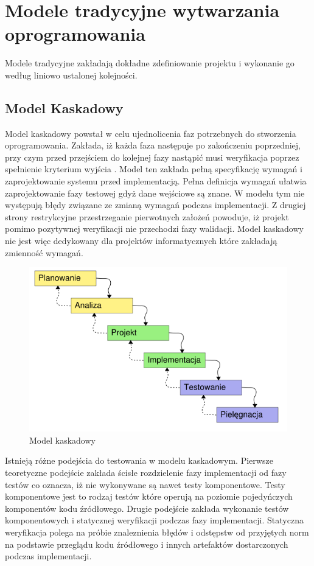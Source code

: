 \section{Modele tradycyjne wytwarzania oprogramowania}
Modele tradycyjne zakładają dokładne zdefiniowanie projektu i wykonanie go według liniowo ustalonej kolejności.
\subsection{Model Kaskadowy}
Model kaskadowy powstał w celu ujednolicenia faz potrzebnych do stworzenia oprogramowania. Zakłada, iż każda faza następuje po zakończeniu poprzedniej, przy czym przed przejściem do kolejnej fazy nastąpić musi weryfikacja poprzez spełnienie kryterium wyjścia \cite{SEaT}. Model ten zakłada pełną specyfikację wymagań i zaprojektowanie systemu przed implementacją. Pełna definicja wymagań ułatwia zaprojektowanie fazy testowej gdyż dane wejściowe są znane. W modelu tym nie występują błędy związane ze zmianą wymagań podczas implementacji. Z drugiej strony restrykcyjne przestrzeganie pierwotnych założeń powoduje, iż projekt pomimo pozytywnej weryfikacji nie przechodzi fazy walidacji. Model kaskadowy nie jest więc dedykowany dla projektów informatycznych które zakładają zmienność wymagań.
\begin{figure}[h]
\centerline{\includegraphics[scale=0.5]{img/model_kaskadowy.png}}
\caption{Model kaskadowy}
\label{fig:kaskadowy}
\end{figure}

Istnieją różne podejścia do testowania w modelu kaskadowym. Pierwsze teoretyczne podejście zakłada ścisłe rozdzielenie fazy implementacji od fazy testów co oznacza, iż nie wykonywane są nawet testy komponentowe. Testy komponentowe jest to rodzaj testów które operują na poziomie pojedyńczych komponentów kodu źródłowego. Drugie podejście zakłada wykonanie  testów komponentowych i statycznej weryfikacji podczas fazy implementacji. Statyczna weryfikacja polega na próbie znaleznienia błędów i odstępstw od przyjętych norm na podstawie przeglądu kodu źródłowego i innych artefaktów dostarczonych podczas implementacji.

